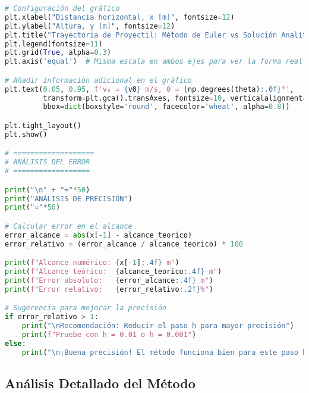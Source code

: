 \documentclass[12pt,a4paper]{article}
\begin{document}
\begin{lstlisting}[language=Python, basicstyle=\small\ttfamily]
# Configuración del gráfico
plt.xlabel("Distancia horizontal, x [m]", fontsize=12)
plt.ylabel("Altura, y [m]", fontsize=12)
plt.title("Trayectoria de Proyectil: Método de Euler vs Solución Analítica", fontsize=14)
plt.legend(fontsize=11)
plt.grid(True, alpha=0.3)
plt.axis('equal')  # Misma escala en ambos ejes para ver la forma real

# Añadir información adicional en el gráfico
plt.text(0.05, 0.95, f'v₀ = {v0} m/s, θ = {np.degrees(theta):.0f}°', 
         transform=plt.gca().transAxes, fontsize=10, verticalalignment='top',
         bbox=dict(boxstyle='round', facecolor='wheat', alpha=0.8))

plt.tight_layout()
plt.show()

# ===================
# ANÁLISIS DEL ERROR
# ==================

print("\n" + "="*50)
print("ANÁLISIS DE PRECISIÓN")
print("="*50)

# Calcular error en el alcance
error_alcance = abs(x[-1] - alcance_teorico)
error_relativo = (error_alcance / alcance_teorico) * 100

print(f"Alcance numérico: {x[-1]:.4f} m")
print(f"Alcance teórico:  {alcance_teorico:.4f} m")
print(f"Error absoluto:   {error_alcance:.4f} m")
print(f"Error relativo:   {error_relativo:.2f}%")

# Sugerencia para mejorar la precisión
if error_relativo > 1:
    print("\nRecomendación: Reducir el paso h para mayor precisión")
    print(f"Pruebe con h = 0.01 o h = 0.001")
else:
    print("\n¡Buena precisión! El método funciona bien para este paso h")
\end{lstlisting}

\subsection*{Análisis Detallado del Método}
\end{document}
